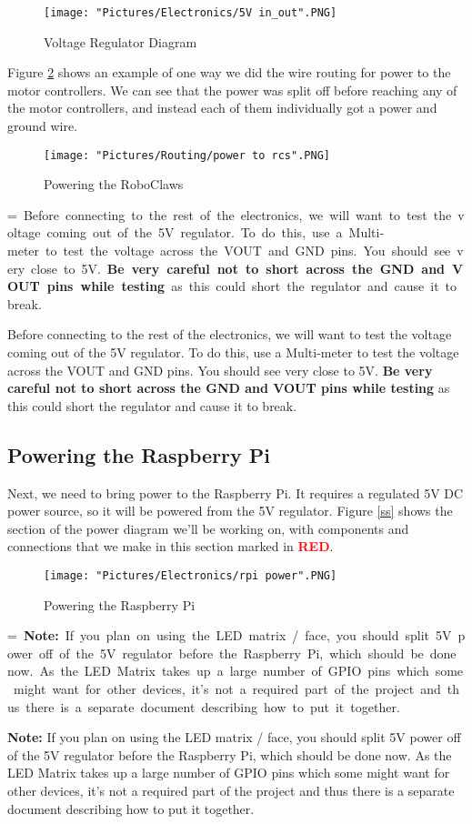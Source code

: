 \documentclass[12pt]{article}
\makeatletter
\newcommand{\mybox}[1]{%
  \setbox0=\hbox{#1}%
  \setlength{\@tempdima}{\dimexpr\wd0+13pt}%
  \begin{tcolorbox}[colframe=mycolor,boxrule=0.5pt,arc=4pt,
      left=6pt,right=6pt,top=6pt,bottom=6pt,boxsep=0pt,width=0.95\textwidth]
    #1
  \end{tcolorbox}
}
\makeatother
\begin{document}
\begin{figure}[H]
  	\centering
    	\texttt{[image: "Pictures/Electronics/5V in\_out".PNG]}
 	\caption{Voltage Regulator Diagram}
	\label{regs}
\end{figure}

\noindent Figure \ref{vm2rcs} shows an example of one way we did the wire routing for power to the motor controllers. We can see that the power was split off before reaching any of the motor controllers, and instead each of them individually got a power and ground wire. 

\begin{figure}[H]
  	\centering
    	\texttt{[image: "Pictures/Routing/power to rcs".PNG]}
 	\caption{Powering the RoboClaws}
	\label{vm2rcs}
\end{figure}


\mybox{
Before connecting to the rest of the electronics, we will want to test the voltage coming out of the 5V regulator. To do this, use a Multi-meter to test the voltage across the VOUT and GND pins.  You should see very close to 5V. \textbf{Be very careful not to short across the GND and VOUT pins while testing} as this could short the regulator and cause it to break.
}

\subsection{Powering the Raspberry Pi}
Next, we need to bring power to the Raspberry Pi. It requires a regulated 5V DC power source, so it will be powered from the 5V regulator. Figure \ref{ss} shows the section of the power diagram we'll be working on, with components and connections that we make in this section marked in \textcolor{red}{\textbf{RED}}.

\begin{figure}[H]
  	\centering
    	\texttt{[image: "Pictures/Electronics/rpi power".PNG]}
 	\caption{Powering the Raspberry Pi}
	\label{rpi power}
\end{figure}

\mybox{
\textbf{Note:} If you plan on using the LED matrix / face, you should split 5V power off of the 5V regulator before the Raspberry Pi, which should be done now. As the LED Matrix takes up a large number of GPIO pins which some might want for other devices, it's not a required part of the project and thus there is a separate document describing how to put it together.
} 
\end{document}
